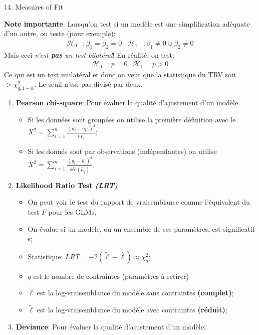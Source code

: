\documentclass[12pt, titlepage, french]{report}
\begin{document}
\begin{CHPT_SUMM}{14. Measures of Fit}
\textbf{Note importante}: Lorsqu'on test si un modèle est une simplification adéquate d'un autre, on teste (pour exemple):
\begin{align*}
	\mathcal{H}_{0}&: \beta_{1} = \beta_{2} = 0	&
	\mathcal{H}_{1}&: \beta_{1} \neq 0 \cup \beta_{2} \neq 0
\end{align*}
Mais ceci \textit{n'est \textbf{pas} un test bilatéral}! En réalité, on test:
\begin{align*}
	\mathcal{H}_{0}&: p = 0	&
	\mathcal{H}_{1}&: p > 0 
\end{align*}
Ce qui est un test unilatéral et donc on veut que la statistique du TRV soit $> \chi^{2}_{q, 1 - \alpha}$. Le seuil n'est pas divisé par deux.
\begin{enumerate}
	\item	\textbf{Pearson chi-square}: Pour évaluer la qualité d'ajustement d'un modèle.
	\begin{itemize}
		\item	Si les données sont groupées on utilise la première définition avec le $X^{2} = \sum_{i = 1}^{n}\frac{(n_{i} - n \hat{p}_{i})^{2}}{n \hat{p}_{i}}$;
		\item	Si les donnés sont par observations (indépendantes) on utilise $X^{2} = \sum_{i = 1}^{n}\frac{(y_{i} - \hat{\mu}_{i})^{2}}{\phi \text{V}(\hat{\mu}_{i})}$.
	\end{itemize}
	\item	\textbf{Likelihood Ratio Test \textit{(LRT)}}
	\begin{itemize}
		\item	On peut voir le test du rapport de vraisemblance comme l'équivalent du test $F$ pour les GLMs;
		\item[]	On évalue si un modèle, ou un ensemble de ses paramètres, est significatif	s;
		\item	Statistique: $LRT = -2(\tilde{\ell} - \hat{\ell}) \approx	\chi_{q}^{2}$;
		\item[]	$q$ est le nombre de contraintes (paramètres à retirer)
		\item[]	$\hat{\ell}$ est la log-vraisemblance du modèle sans contraintes \textbf{(complet)};
		\item[]	$\tilde{\ell}$ est la log-vraisemblance du modèle avec contraintes \textbf{(réduit)};
	\end{itemize}
	\item	\textbf{Deviance}: Pour évaluer la qualité d'ajustement d'un modèle;

\end{enumerate}
\end{CHPT_SUMM}
\end{document}

